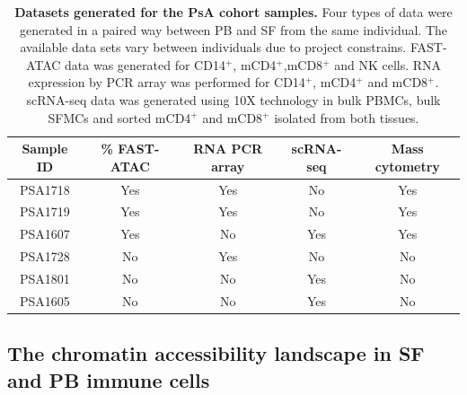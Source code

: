 \begin{table}[htbp]
\centering
\begin{tabular}{@{} c c c c c}
\toprule
\textbf{Sample ID} & \textbf{\% FAST-ATAC} & \textbf{RNA PCR array} & \textbf{scRNA-seq} & \textbf{Mass cytometry} \\
\midrule
\midrule
PSA1718 & Yes & Yes & No & Yes\\
PSA1719 & Yes & Yes & No & Yes\\
PSA1607 & Yes & No & Yes & Yes\\
PSA1728 & No & Yes & No & No\\
PSA1801 & No & No & Yes & No\\
PSA1605 & No & No & Yes & No\\
\bottomrule
\end{tabular}
\medskip %
\caption[Datasets generated for the PsA cohort samples]{\textbf{Datasets generated for the PsA cohort samples.} Four types of data were generated in a paired way between PB and SF from the same individual. The available data sets vary between individuals due to project constrains. FAST-ATAC data was generated for CD14$^+$, mCD4$^+$,mCD8$^+$ and NK cells. RNA expression by PCR array was performed for CD14$^+$, mCD4$^+$ and mCD8$^+$. scRNA-seq data was generated using 10X technology in bulk PBMCs, bulk SFMCs and sorted mCD4$^+$ and mCD8$^+$ isolated from both tissues.}
\label{tab:PSA_datasets_per_sample}
\end{table}
\bigskip %


\subsection{The chromatin accessibility landscape in SF and PB immune cells}

